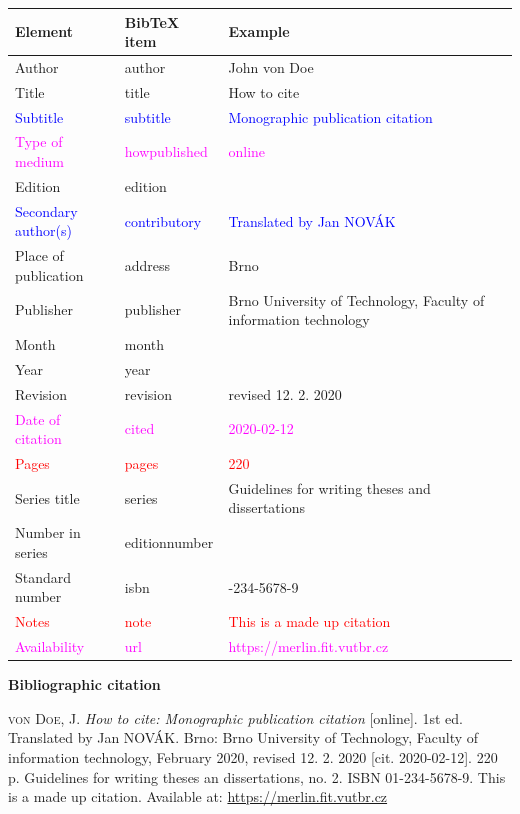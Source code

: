 \begin{tabularx}{0.95\linewidth}{>{\raggedright\arraybackslash}X X >{\raggedright\arraybackslash}X}
    Element & BibTeX item & Example\\\hline
    Author & author & John von Doe\\
    Title & title & How to cite\\
    \textcolor{blue}{Subtitle} & \textcolor{blue}{subtitle} & \textcolor{blue}{Monographic publication citation}\\
    \textcolor{magenta}{Type of medium} & \textcolor{magenta}{howpublished} & \textcolor{magenta}{online}\\
    Edition & edition & 1\\
    \textcolor{blue}{Secondary author(s)} & \textcolor{blue}{contributory} & \textcolor{blue}{Translated by Jan NOVÁK}\\
    Place of publication & address & Brno\\
    Publisher & publisher & Brno University of Technology, Faculty of information technology\\
    Month & month & 2\\
    Year & year & 2020\\
    Revision & revision & revised 12. 2. 2020\\
    \textcolor{magenta}{Date of citation} & \textcolor{magenta}{cited} & \textcolor{magenta}{2020-02-12}\\
    \textcolor{red}{Pages} & \textcolor{red}{pages} & \textcolor{red}{220}\\
    Series title & series & Guidelines for writing theses and dissertations\\
    Number in series & editionnumber & 2\\
    Standard number & isbn & 01-234-5678-9\\
    \textcolor{red}{Notes} & \textcolor{red}{note} & \textcolor{red}{This is a made up citation}\\
    \textcolor{magenta}{Availability} & \textcolor{magenta}{url} & \textcolor{magenta}{https://merlin.fit.vutbr.cz}\\
\end{tabularx}

\bigskip

\noindent \textbf{Bibliographic citation}

\medskip

\noindent \textsc{von Doe}, J. \textit{How to cite: Monographic publication citation} [online]. 1st ed. Translated by Jan NOVÁK.
Brno: Brno University of Technology, Faculty of information technology, February 2020, revised 12. 2. 2020 [cit. 2020-02-12]. 220 p. Guidelines for writing theses an dissertations, no. 2. ISBN 01-234-5678-9. This is a made up citation. Available at: \url{https://merlin.fit.vutbr.cz}
\newpage
